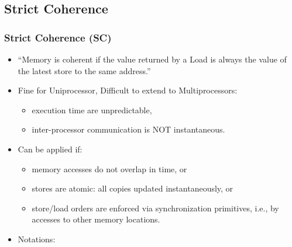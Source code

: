 \documentclass{beamer}
\renewcommand{\emph}[1]{\textcolor{structure}{#1}}
\newcommand{\emp}[1]{\textcolor{DikuRed}{ #1}}
\begin{document}
\subsection{Strict Coherence}

\begin{frame}[fragile,t]
\frametitle{Strict Coherence (SC)}

\begin{itemize}
    \item \emph{``Memory is coherent if the value returned by a Load
            is always the value of the latest store to the same 
            address.''}\medskip

    \item Fine for Uniprocessor, \emp{Difficult to extend to Multiprocessors}:
        \begin{itemize}
            \item execution time are unpredictable,
            \item inter-processor communication is NOT instantaneous.
        \end  {itemize}\smallskip

    \item \emp{Can be applied if}:
        \begin{itemize}
            \item memory accesses do not overlap in time, or
            \item \emp{stores are atomic}: all copies updated instantaneously, or
            \item store/load orders are enforced via synchronization 
                    primitives, i.e., by accesses to other memory locations.
        \end  {itemize}\smallskip

    \item \emp{Notations:}
\end{itemize}
\vspace{-3ex}


\end{frame}
\end{document}
